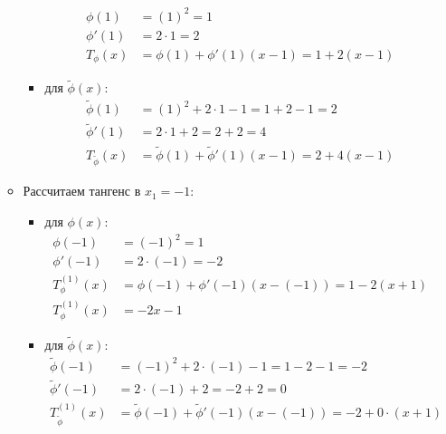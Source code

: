 \documentclass[12pt]{scrartcl}
\begin{document}
\begin{enumerate}
\begin{itemize}
\begin{itemize}
\begin{align*}
                \phi(1) &= (1)^2 = 1 \\
                \phi'(1) &= 2 \cdot 1 = 2 \\
                T_{\phi}(x) &= \phi(1) + \phi'(1)(x - 1) = 1 + 2(x - 1)
            \end{align*}
            \item для $\tilde{\phi}(x)$:
            \begin{align*}
                \tilde{\phi}(1) & = (1)^2 + 2 \cdot 1 - 1 = 1 + 2 - 1 = 2 \\
                \tilde{\phi}'(1) &= 2 \cdot 1 + 2 = 2 + 2 = 4 \\
                T_{\tilde{\phi}}(x) &= \tilde{\phi}(1) + \tilde{\phi}'(1)(x - 1) = 2 + 4(x - 1)
            \end{align*}
        \end{itemize}
        \item Рассчитаем тангенс в $x_{1} = -1$:
        \begin{itemize}
            \item для $\phi(x)$:
            \begin{align*}
                \phi(-1) &= (-1)^2 = 1 \\
                \phi'(-1) &= 2 \cdot (-1) = -2 \\
                T_{\phi}^{(1)}(x) &= \phi(-1) + \phi'(-1)(x - (-1)) = 1 - 2(x + 1) \\
                T_{\phi}^{(1)}(x) &= -2x - 1
            \end{align*}
            \item для $\tilde{\phi}(x)$:
            \begin{align*}
                \tilde{\phi}(-1) &= (-1)^2 + 2 \cdot (-1) - 1 = 1 - 2 - 1 = -2 \\
                \tilde{\phi}'(-1) &= 2 \cdot (-1) + 2 = -2 + 2 = 0 \\
                T_{\tilde{\phi}}^{(1)}(x) &= \tilde{\phi}(-1) + \tilde{\phi}'(-1)(x - (-1)) = -2 + 0 \cdot (x + 1) \\

\end{align*}
\end{itemize}
\end{itemize}
\end{enumerate}
\end{document}

